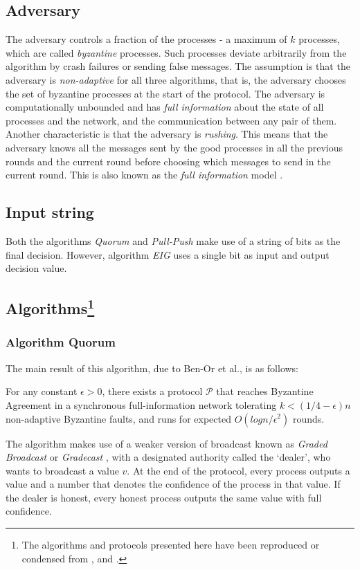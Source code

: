 \subsection{Adversary}
The adversary controls a fraction of the processes - a maximum of $k$ processes, which are called \textit{byzantine} processes. Such processes deviate arbitrarily from the algorithm by crash failures or sending false messages. The assumption is that the adversary is \textit{non-adaptive} for all three algorithms, that is, the adversary chooses the set of byzantine processes at the start of the protocol. The adversary is computationally unbounded and has \textit{full information} about the state of all processes and the network, and the communication between any pair of them. Another characteristic is that the adversary is \textit{rushing}. This means that the adversary knows all the messages sent by the good processes in all the previous rounds and the current round before choosing which messages to send in the current round. This is also known as the \textit{full information} model \cite{GGL98}.

\subsection{Input string}
Both the algorithms \textit{Quorum} and \textit{Pull-Push}  make use of a string of bits as the final decision. However, algorithm \textit{EIG} uses a single bit as input and output decision value.


\subsection{Algorithms\protect\footnote{The algorithms and protocols presented here have been reproduced or condensed from \cite{BPV06}, \cite{KM13} and \cite{BGH13}.}}

\subsubsection{Algorithm Quorum\cite{BPV06}}
The main result of this algorithm, due to Ben-Or et al., is as follows:
\begin{theorem}
For any constant $\epsilon > 0$, there exists a protocol $\mathcal{P}$ that reaches Byzantine Agreement in a synchronous full-information network tolerating $k < (1/4 - \epsilon) n$ non-adaptive Byzantine faults, and runs for expected $O(logn/\epsilon^2)$ rounds. 
\end{theorem}
The algorithm makes use of a weaker version of broadcast known as \textit{Graded Broadcast} or \textit{Gradecast} \cite{FM97}, with a designated authority called the `dealer', who wants to broadcast a value $v$. At the end of the protocol, every process outputs a value and a number that denotes the confidence of the process in that value. If the dealer is honest, every honest process outputs the same value with full confidence. 

